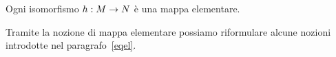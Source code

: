 \begin{theorem}\label{isomorfismisonoelementari}
Ogni isomorfismo $h:M\rightarrow N$ \`e una mappa elementare.\QED
\end{theorem}
\begin{comment}
\begin{proof}
Per definizione gli isomorfismi sono immersioni totali e suriettive. Dimostriamo per induzione sulla sintassi di $\phi(x)$ l'equivalenza 

\hspace*{15ex}\rlap{$M\models\phi(a)$}%
\hspace{13ex}$\IFF\ \ N\models\phi(ha)$\ \ per ogni tupla $a$ di elementi di $M$

Il caso in cui $\phi(x)$ \`e libera \`e garantito per ipotesi (vedi definizione~\ref{defimmersioneparziale}). Il passo induttivo per il connettivo $\vee$ \`e immediato. Il passo induttivo per la negazione  \`e anche immediato grazie alla doppia implicazione. Poich\'e gli isomorfismi sono suriettivi ed iniettivi, il passo induttivo per il quantificatori esistenziale segue, nella direzione $\IMP$, dalla proposizioni~\ref{presesis}. Per la direzione $\PMI$, applichiamo l'ipotesi induttiva alla formula $\neg\phi(x,y)$ per ottenere

\hspace*{15ex}\rlap{$M\models\neg\phi(a,b)$}%
\hspace{18ex}\rlap{$\IMP\ \ N\models\neg\phi(ha,hb)$}\hspace{23ex} per ogni coppia di tuple $a,b$ in $M$

Quindi dalla proposizione~\ref{presuniv} otteniamo

\hspace*{15ex}\rlap{$M\models\A y\neg\phi(a,y)$}%
\hspace{18ex}\rlap{$\IMP\ \ N\models\A y\neg\phi(ha,y)$}\hspace{23ex} per ogni tupla $a$ in $M$.

Che diventa

\hspace*{15ex}\rlap{$M\models\E y\,\phi(a,y)$}%
\hspace{18ex}\rlap{$\PMI\ \ N\models\E y\,\phi(ha,y)$}\hspace{23ex} per ogni tupla $a$ in $M$.
\end{proof}
\end{comment}

Tramite la nozione di mappa elementare possiamo riformulare alcune nozioni introdotte nel paragrafo~\ref{eqel}.

